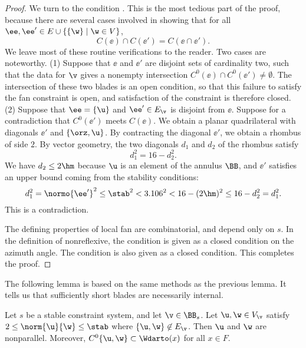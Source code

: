\begin{proof}
We turn to the condition .  This is the most tedious part 
of the proof, because there are several cases involved in showing that 
for all $\ee ,\ee '\in E \cup \{\{\w\}\mid \w\in V\}$, 
\[ C(\ee )\cap C(\ee ') = C(\ee \cap \ee ').\] We leave most of these
routine verifications to the reader.  Two cases are noteworthy.  (1)
Suppose that $\ee$ and $\ee'$ are disjoint sets of cardinality two,
such that the data for $\v$ gives a nonempty intersection
$C^0(\ee)\cap C^0(\ee')\ne\emptyset$.  The intersection of these two
blades is an open condition, so that this failure to satisfy the fan
constraint is open, and satisfaction of the constraint is therefore
closed.  (2) Suppose that $\ee=\{\u\}$ and $\ee'\in E_\v$ is disjoint
from $\ee$.  Suppose for a contradiction that $C^0(\ee')$ meets
$C(\ee)$.  We obtain a planar quadrilateral with diagonals $\ee'$ and
$\{\orz,\u\}$.  By contracting the diagonal $\ee'$, we obtain a
rhombus of side $2$.  By vector geometry, the two diagonals $d_1$ and
$d_2$ of the rhombus satisfy
\begin{equation}\label{eqn:rhombus16}
d_1^2 = 16 - d_2^2.
\end{equation}
We have $d_2\le 2\hm$ because  $\u$ is an element of the annulus $\BB$,
 and $\ee'$ satisfies an upper bound coming from the
stability conditions:
\begin{equation}\label{eqn:rhombus}
d_1^2 = \normo{\ee'}^2\le \stab^2< 3.106^2 <  
16-(2\hm)^2 \le 16-d_2^2 = d_1^2.
\end{equation}
This is a contradiction. 

The defining properties of local fan are combinatorial, and depend only on 
$s$.
In the definition of nonreflexive, the condition  is given
as a closed condition on the azimuth angle.  The condition
 is also given as a closed condition.
This completes the proof.
\end{proof}

The following lemma is based on the same methods as the previous
lemma.  It tells us that sufficiently short blades are necessarily
internal.

\begin{lemma}[]\label{lemma:2hm-slice}
Let $s$ be a stable constraint system, and let $\v\in \BB_s$.
Let $\u,\w\in V_\v$ satisfy $2\le\norm{\u}{\w}\le \stab$ where
$\{\u,\w\}\not\in E_\v$.  Then $\u$ and $\w$ are nonparallel.
Moreover,
$C^0\{\u,\w\}\subset \Wdarto(x)$ for all $x\in F$.
\end{lemma}

